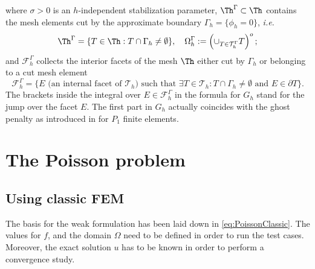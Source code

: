 where $\sigma> 0$ is an $h$-independent stabilization parameter,  $\Th^{\Gamma}\subset\Th$ contains the mesh elements cut by the approximate boundary $\Gamma_h=\{\phi_h=0\}$, 
\textit{i.e.}
\begin{equation*}
\Th^{\Gamma}=\{T\in\Th:T\cap\Gamma_h\neq\emptyset\},
\quad
\Omega_h^{\Gamma}:=\left(\cup_{T\in \mathcal{T}_h^{\Gamma}}T\right)^o ;
\end{equation*}
and $\mathcal{F}_h^{\Gamma}$ collects the interior facets of the mesh $\Th$ either cut by $\Gamma_h$ or belonging to a cut mesh element
\begin{equation*}
  \mathcal{F}_h^{\Gamma} = \{E \text{ (an internal facet of } \mathcal{T}_h)
  \text{ such that } \exists T \in \mathcal{T}_h : T \cap \Gamma_h \neq
  \emptyset \text{ and } E \in \partial T\}.
\end{equation*}
The brackets inside the integral over $E\in\mathcal{F}_h^{\Gamma}$ in the formula for $G_h$ stand for the jump over the facet $E$. The first part in $G_h$ actually coincides with the ghost penalty as introduced in \parencite{burman2010ghost} for $P_1$ finite elements. 


\section{The Poisson problem}

\subsection{Using classic FEM}

The basis for the weak formulation has been laid down in \eqref{eq:PoissonClassic}. The values for $f$, and the domain $\Omega$ need to be defined in order to run the test cases. Moreover, the exact solution $u$ has to be known in order to perform a convergence study. 

